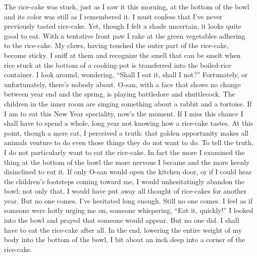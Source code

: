 \documentclass[12pt, openright]{book}
\begin{document}
The rice-cake was stuck, just as I saw it this morning, at the bottom of
the bowl and its color was still as I remembered it. I must confess that
I've never previously tasted rice-cake. Yet, though I felt a shade
uncertain, it looks quite good to eat. With a tentative front paw I rake
at the green vegetables adhering to the rice-cake. My claws, having
touched the outer part of the rice-cake, become sticky. I sniff at them
and recognize the smell that can be smelt when rice stuck at the bottom
of a cooking-pot is transferred into the boiled-rice container. I look
around, wondering, ``Shall I eat it, shall I not?'' Fortunately, or
unfortunately, there's nobody about. O-san, with a face that shows no
change between year end and the spring, is playing battledore and
shuttlecock. The children in the inner room are singing something about
a rabbit and a tortoise. If I am to eat this New Year speciality, now's
the moment. If I miss this chance I shall have to spend a whole, long
year not knowing how a rice-cake tastes. At this point, though a mere
cat, I perceived a truth: that golden opportunity makes all animals
venture to do even those things they do not want to do. To tell the
truth, I do not particularly want to eat the rice-cake. In fact the more
I examined the thing at the bottom of the bowl the more nervous I became
and the more keenly disinclined to eat it. If only O-san would open the
kitchen door, or if I could hear the children's footsteps coming toward
me, I would unhesitatingly abandon the bowl; not only that, I would have
put away all thought of rice-cakes for another year. But no one comes.
I've hesitated long enough. Still no one comes. I feel as if someone
were hotly urging me on, someone whispering, ``Eat it, quickly!'' I
looked into the bowl and prayed that someone would appear. But no one
did. I shall have to eat the rice-cake after all. In the end, lowering
the entire weight of my body into the bottom of the bowl, I bit about an
inch deep into a corner of the rice-cake.
\end{document}
